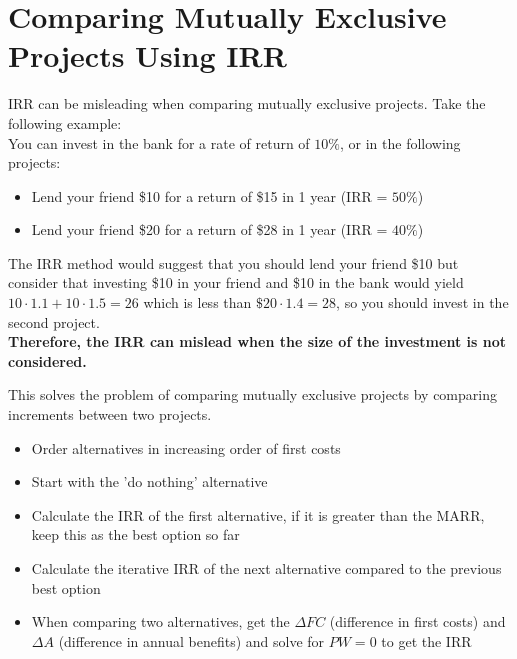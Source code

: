\section{Comparing Mutually Exclusive Projects Using IRR}

\begin{proposition}
    IRR can be misleading when comparing mutually exclusive projects. Take the following example:\\
    You can invest in the bank for a rate of return of $10\%$, or in the following projects:
    \begin{itemize}
        \item Lend your friend \$10 for a return of \$15 in 1 year (IRR = $50\%$)
        \item Lend your friend \$20 for a return of \$28 in 1 year (IRR = $40\%$)
    \end{itemize}
    The IRR method would suggest that you should lend your friend \$10 but consider that investing \$10 in your friend and \$10 in the bank would yield $10\cdot 1.1 + 10\cdot 1.5 = 26$ which is less than $\$20\cdot 1.4 = 28$, so you should invest in the second project. \\
    \textbf{Therefore, the IRR can mislead when the size of the investment is not considered.}
\end{proposition}
\begin{theorem}
    This solves the problem of comparing mutually exclusive projects by comparing increments between two projects.\\
    \begin{itemize}
        \item Order alternatives in increasing order of first costs
        \item Start with the 'do nothing' alternative
        \item Calculate the IRR of the first alternative, if it is greater than the MARR, keep this as the best option so far
        \item Calculate the iterative IRR of the next alternative compared to the previous best option
        \item When comparing two alternatives, get the $\Delta FC$ (difference in first costs) and $\Delta A$ (difference in annual benefits) and solve for $PW =0$ to get the IRR
    \end{itemize}
\end{theorem}